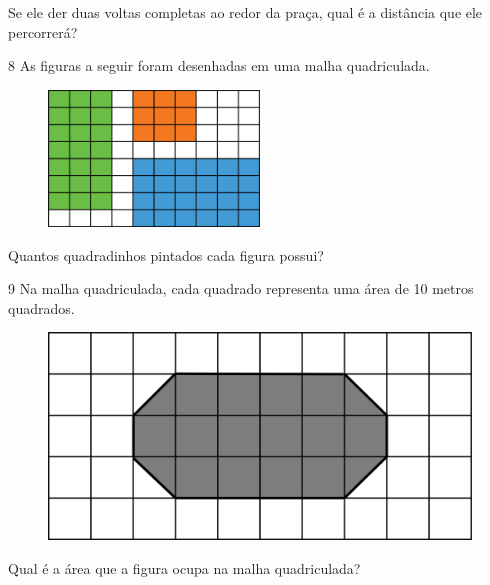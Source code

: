 Se ele der duas voltas completas ao redor da praça, qual é a distância que ele percorrerá?


\num{8} As figuras a seguir foram desenhadas em uma malha quadriculada.

\begin{figure}[htpb!]
\centering
\includegraphics[width=0.5\textwidth]{./media/image56.png}
\end{figure}

Quantos quadradinhos pintados cada figura possui?

\num{9} Na malha quadriculada, cada quadrado representa uma área de 10 metros quadrados.

\begin{figure}[htpb!]
\centering
\includegraphics[width=.6\textwidth]{./media/image60.png}
\end{figure}

Qual é a área que a figura ocupa na malha quadriculada?

\vspace{2em}

